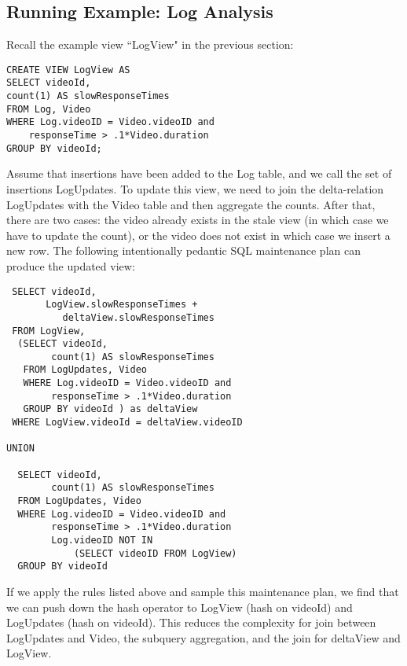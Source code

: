 \subsection{Running Example: Log Analysis}
Recall the example view ``LogView" in the previous section:
\begin{lstlisting} 
CREATE VIEW LogView AS 
SELECT videoId, 
count(1) AS slowResponseTimes 
FROM Log, Video
WHERE Log.videoID = Video.videoID and
    responseTime > .1*Video.duration
GROUP BY videoId;
\end{lstlisting}

Assume that insertions have been added to the Log table, and we call the set of insertions LogUpdates.
To update this view, we need to join the delta-relation LogUpdates with the Video table and then aggregate the counts.
After that, there are two cases: the video already exists in the stale view (in which case we have to update the count), or
the video does not exist in which case we insert a new row.
The following intentionally pedantic SQL maintenance plan can produce the updated view: 
\begin{lstlisting}
 SELECT videoId, 
       LogView.slowResponseTimes + 
          deltaView.slowResponseTimes
 FROM LogView,
  (SELECT videoId, 
        count(1) AS slowResponseTimes 
   FROM LogUpdates, Video
   WHERE Log.videoID = Video.videoID and
        responseTime > .1*Video.duration
   GROUP BY videoId ) as deltaView
 WHERE LogView.videoId = deltaView.videoID

UNION 

  SELECT videoId, 
        count(1) AS slowResponseTimes 
  FROM LogUpdates, Video
  WHERE Log.videoID = Video.videoID and
        responseTime > .1*Video.duration
        Log.videoID NOT IN 
            (SELECT videoID FROM LogView)
  GROUP BY videoId

\end{lstlisting}
If we apply the rules listed above and sample this maintenance plan, we find that we can push down the hash operator to LogView (hash on videoId) and LogUpdates (hash on videoId). 
This reduces the complexity for join between LogUpdates and Video, the subquery aggregation, and the join for deltaView and LogView.
